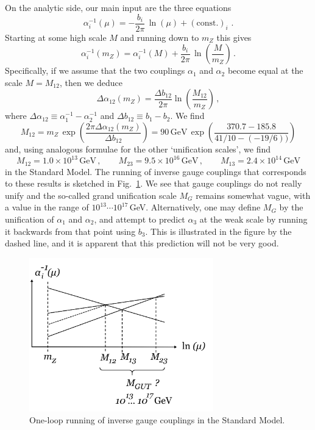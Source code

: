 \documentclass[12pt]{article}
\newcommand{\be}{\begin{equation}}
\newcommand{\ee}{\end{equation}}
\numberwithin{equation}{section}
\begin{document}
On the analytic side, our main input are the three equations
\be
\alpha_i^{-1}(\mu)=-\frac{b_i}{2\pi}\,\ln(\mu)+(\mbox{const.})_i\,\,.
\ee
Starting at some high scale $M$ and running down to $m_Z$ this gives
\be
\alpha_i^{-1}(m_Z)=\alpha_i^{-1}(M)+\frac{b_i}{2\pi}\, \ln\left(\frac{M}{m_Z}\right)\,.
\ee
Specifically, if we assume that the two couplings $\alpha_1$ and $\alpha_2$ become equal at the scale $M=M_{12}$, then we deduce 
\be
\Delta\alpha_{12}(m_Z)=\frac{\Delta b_{12}}{2\pi} \ln\left(\frac{M_{12}}{m_Z}\right)\,,\label{a12}
\ee
where $\Delta\alpha_{12}\equiv\alpha_1^{-1}-\alpha_2^{-1}$ and $\Delta b_{12}\equiv b_1-b_2$. We find
\be
M_{12}=m_Z\,\exp\left(\frac{2\pi\Delta\alpha_{12}(m_Z)}{\Delta b_{12}}\right)
=90\,\mbox{GeV}\,\exp\left(\frac{370.7-185.8}{41/10-(-19/6))}\right)
\ee
and, using analogous formulae for the other `unification scales', we find
\be
M_{12}=1.0\times 10^{13}\,\mbox{GeV}\,,\qquad
M_{23}=9.5\times 10^{16}\,\mbox{GeV}\,,\qquad
M_{13}=2.4\times 10^{14}\,\mbox{GeV}
\ee
in the Standard Model. The running of inverse gauge couplings that corresponds to these results is sketched in Fig.~\ref{smun}. We see that gauge couplings do not really unify and the so-called grand unification scale $M_G$ remains somewhat vague, with a value in the range of $10^{13}\cdots 10^{17}\,$GeV. Alternatively, one may define $M_G$ by the unification of $\alpha_1$ and $\alpha_2$, and attempt to predict $\alpha_3$ at the weak scale by running it backwards from that point using $b_3$. This is illustrated in the figure by the dashed line, and it is apparent that this prediction will not be very good.

\begin{figure}[ht]
\begin{center} 
\includegraphics[width=8cm]{smun.png}
\caption{One-loop running of inverse gauge couplings in the Standard Model.}
\label{smun} 
\end{center}
\end{figure}
\end{document}
